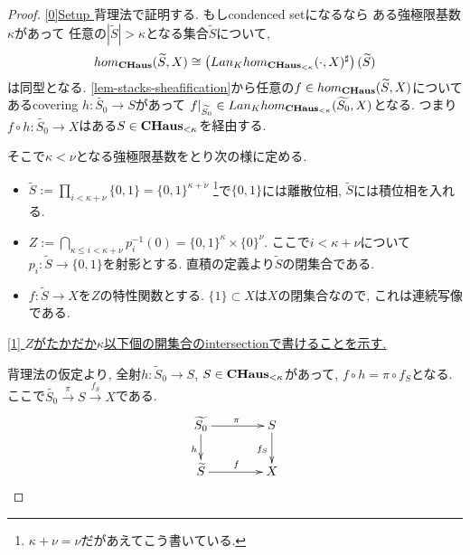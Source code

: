 \documentclass[dvipdfmx,a4paper,11pt]{article}
\newcommand{\colim}{{\rm colim}}
\theoremstyle{definition}
\begin{document}
 \begin{proof}

\underline{[0]Setup }
 背理法で証明する. 
もしcondenced setになるなら
 ある強極限基数$\kappa$があって
任意の$|\widetilde{S}|> \kappa$となる集合$\widetilde{S}$について,
$$
hom_{{\bf CHaus}}(\widetilde{S},  X) 
\cong   \left( Lan_{K}hom_{{\bf CHaus}_{< \kappa}}(\cdot,  X )^{\sharp} \right)(\widetilde{S})
$$
は同型となる. 
\ref{lem-stacks-sheafification}から任意の$f \in hom_{{\bf CHaus}}(\widetilde{S},  X) $について
あるcovering $h : \widetilde{S_0} \to S$があって
$f|_{\widetilde{S_0}} \in  Lan_{K}
hom_{{\bf CHaus}_{< \kappa}}(\widetilde{S_0},  X )$となる.
つまり$f \circ h : \widetilde{S_0} \to X$はある$S \in {\bf CHaus}_{< \kappa}$を経由する. 



そこで$\kappa < \nu$となる強極限基数をとり次の様に定める.
\begin{itemize}
\item $\widetilde{S} := \prod_{i < \kappa +\nu} \{0,1\} =\{0,1\}^{\kappa + \nu}$ \footnote{$\kappa + \nu=\nu$だがあえてこう書いている. }で$\{ 0,1\}$には離散位相, $\widetilde{S}$には積位相を入れる.
\item  $Z := \bigcap_{\kappa \le  i < \kappa +\nu} p^{-1}_{i}(0) = \{0,1\}^{\kappa} \times \{ 0\}^{\nu}$. ここで$i < \kappa +\nu$について$p_i : \widetilde{S} \to \{0,1 \}$を射影とする. %
直積の定義より$\widetilde{S}$の閉集合である.
\item $f : \widetilde{S} \to X$を$Z$の特性関数とする. $\{1\} \subset X$は$X$の閉集合なので, これは連続写像である. 
\end{itemize}

\underline{[1] $Z$がたかだか$\kappa$以下個の開集合のintersectionで書けることを示す.} 

背理法の仮定より, 全射$h : \widetilde{S}_0 \to S$,  $S \in {\bf CHaus}_{< \kappa}$があって, 
$f \circ h = \pi \circ f_{S}$となる. ここで$\widetilde{S_0} \overset{\pi}{\to} S \overset{f_S}{\to} X$である.
\begin{equation*}
\xymatrix@C=40pt@R=20pt{
\widetilde{S_0} \ar@{->}[d]_{h}\ar@{->}[r]^{\pi}
& S\ar@{->}[d]_{f_{S}}
\\
\widetilde{S} \ar@{->}[r]^{f}&
X
}
\end{equation*}


\end{proof}
\end{document}
